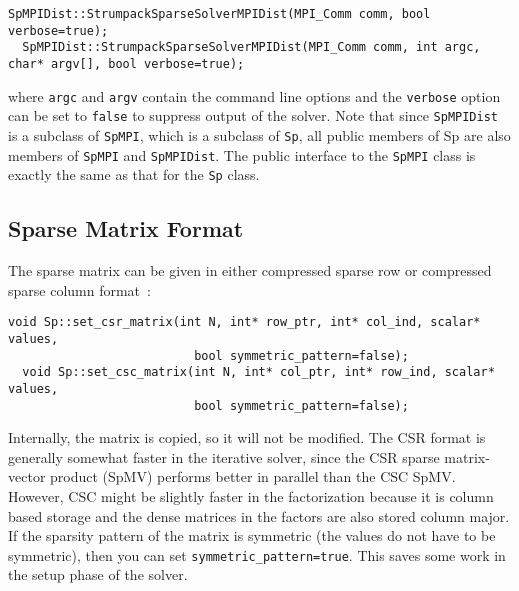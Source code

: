\documentclass{article}
\begin{document}
\begin{lstlisting}[style=C]
  SpMPIDist::StrumpackSparseSolverMPIDist(MPI_Comm comm, bool verbose=true);
  SpMPIDist::StrumpackSparseSolverMPIDist(MPI_Comm comm, int argc, char* argv[], bool verbose=true);
\end{lstlisting}
where \lstinline[style=C]!argc! and \lstinline[style=C]!argv! contain
the command line options and the \lstinline[style=C]!verbose! option
can be set to \lstinline[style=C]!false! to suppress output of the
solver. Note that since \lstinline[style=C]!SpMPIDist! is a subclass
of \lstinline[style=C]!SpMPI!, which is a subclass of
\lstinline[style=C]!Sp!, all public members of Sp are also members of
\lstinline[style=C]!SpMPI! and \lstinline[style=C]!SpMPIDist!. The
public interface to the \lstinline[style=C]!SpMPI! class is exactly
the same as that for the \lstinline[style=C]!Sp! class.

\subsection{Sparse Matrix Format}
The sparse matrix can be given in either compressed sparse row or
compressed sparse column format~\cite{saad2003iterative}:
\begin{lstlisting}[style=C]
  void Sp::set_csr_matrix(int N, int* row_ptr, int* col_ind, scalar* values,
                          bool symmetric_pattern=false);
  void Sp::set_csc_matrix(int N, int* col_ptr, int* row_ind, scalar* values,
                          bool symmetric_pattern=false);
\end{lstlisting}
Internally, the matrix is copied, so it will not be modified.  The CSR
format is generally somewhat faster in the iterative solver, since the
CSR sparse matrix-vector product (SpMV) performs better in parallel
than the CSC SpMV. However, CSC might be slightly faster in the
factorization because it is column based storage and the dense
matrices in the factors are also stored column major. If the sparsity
pattern of the matrix is symmetric (the values do not have to be
symmetric), then you can set
\lstinline[style=C]!symmetric_pattern=true!. This saves some work in
the setup phase of the solver.
\end{document}
